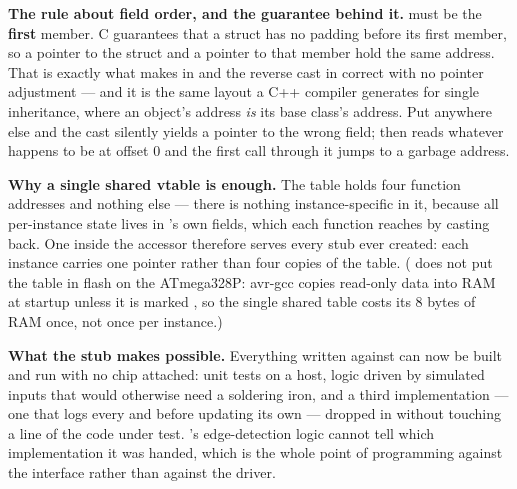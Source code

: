 \medskip \textbf{The rule about field order, and the guarantee behind it.}  must be the \textbf{first} member. C guarantees that a struct has no padding before its first
member, so a pointer to the struct and a pointer to that member hold the same address. That is
exactly what makes  in  and the reverse cast
in  correct with no pointer adjustment --- and it is the same layout a C++ compiler
generates for single inheritance, where an object's address \emph{is} its base class's address. Put
 anywhere else and the cast silently yields a pointer to the wrong field;
 then reads whatever happens to be at offset 0 and the first call through it jumps
to a garbage address. 

\textbf{Why a single shared vtable is enough.} The table holds four function addresses and nothing
else --- there is nothing instance-specific in it, because all per-instance state lives in
's own fields, which each function reaches by casting  back. One
 inside the accessor therefore serves every stub ever created: each
instance carries one pointer rather than four copies of the table. ( does not put the
table in flash on the ATmega328P: avr-gcc copies read-only data into RAM at startup unless it is
marked , so the single shared table costs its 8 bytes of RAM once, not once per
instance.) 

\textbf{What the stub makes possible.} Everything written against  can now
be built and run with no chip attached: unit tests on a host, logic driven by simulated inputs that
would otherwise need a soldering iron, and a third implementation --- one that logs every
 and  before updating its own  --- dropped in without
touching a line of the code under test. 's edge-detection logic cannot tell which
implementation it was handed, which is the whole point of programming against the interface rather
than against the driver. 
